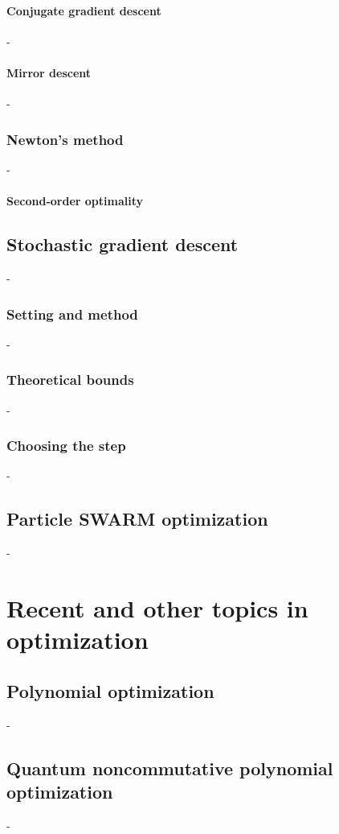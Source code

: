 \documentclass[12pt,openany,oneside]{book}
\theoremstyle{definition}
\numberwithin{exercise}{section}
\numberwithin{definition}{section}
\numberwithin{theorem}{section}
\numberwithin{corollary}{section}
\numberwithin{proposition}{section}
\numberwithin{notation}{section}
\numberwithin{remark}{section}
\numberwithin{hypothesis}{section}
\numberwithin{example}{section}
\begin{document}
\subsubsection{Conjugate gradient descent}-
\subsubsection{Mirror descent}-
\subsection{Newton's method}-
\subsubsection{Second-order optimality}

\section{Stochastic gradient descent}-

\subsection{Setting and method}-
\subsection{Theoretical bounds}-
\subsection{Choosing the step}-
\section{Particle SWARM optimization}-

\chapter{Recent and other topics in optimization}

\section{Polynomial optimization}-
\section{Quantum noncommutative polynomial optimization}-
\end{document}
